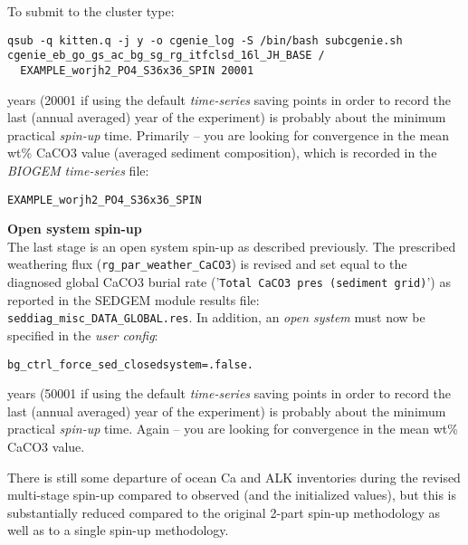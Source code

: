 \documentclass[10pt,twoside]{article}
\begin{document}
\begin{compactenum}
\noindent To submit to the cluster type:
\vspace{-5pt}\begin{verbatim}qsub -q kitten.q -j y -o cgenie_log -S /bin/bash subcgenie.sh
cgenie_eb_go_gs_ac_bg_sg_rg_itfclsd_16l_JH_BASE /
  EXAMPLE_worjh2_PO4_S36x36_SPIN 20001
\end{verbatim}\vspace{-5pt}

 years (20001 if using the default \textit{time-series} saving points in order to record the last (annual averaged) year of the experiment) is probably about the minimum practical \textit{spin-up} time. Primarily -- you are looking for convergence in the mean wt\% CaCO3 value (averaged sediment composition), which is recorded in the \textit{BIOGEM} \textit{time-series} file:
\vspace{-5pt}\begin{verbatim}EXAMPLE_worjh2_PO4_S36x36_SPIN\end{verbatim}\vspace{-5pt}

        \item \textbf{Open system spin-up}
        \\The last stage is an open system spin-up as described previously. The prescribed weathering flux (\texttt{rg\_par\_weather\_CaCO3}) is revised and set equal to the diagnosed global CaCO3 burial rate ('\texttt{Total CaCO3 pres (sediment grid)}') as reported in the SEDGEM module results file:
\\\texttt{seddiag\_misc\_DATA\_GLOBAL.res}.
In addition, an \textit{open system} must now be specified in the \textit{user config}:
\vspace{-5pt}\begin{verbatim}bg_ctrl_force_sed_closedsystem=.false.\end{verbatim}\vspace{-5pt}

 years (50001 if using the default \textit{time-series} saving points in order to record the last (annual averaged) year of the experiment) is probably about the minimum practical \textit{spin-up} time. Again -- you are looking for convergence in the mean wt\% CaCO3 value.

\end{compactenum}

There is still some departure of ocean Ca and ALK inventories during the revised multi-stage spin-up compared to observed (and the initialized values), but this is substantially reduced compared to the original 2-part spin-up methodology as well as to a single spin-up methodology.
\end{document}

